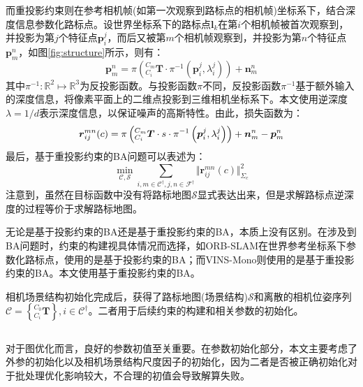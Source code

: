 \begin{enumerate}
        而重投影约束则在参考相机帧(如第一次观察到路标点的相机帧)坐标系下，结合深度信息参数化路标点。设世界坐标系下的路标点$\boldsymbol{l}_k$在第$i$个相机帧被首次观察到，并投影为第$j$个特征点$\boldsymbol{p}_i^j$，而后又被第$m$个相机帧观察到，并投影为第$n$个特征点$\boldsymbol{p}_m^n$，如图\ref{fig:structure}所示，则有：
        \begin{equation}
          \boldsymbol{p}_m^n=\pi\left({^{C_m}_{C_i}\boldsymbol{T}}\cdot \pi^{-1}\left(\boldsymbol{p}_i^j,\lambda_i^j\right)\right) +\boldsymbol{n}_m^n
        \end{equation}
        其中$\pi^{-1}:\mathbb{R}^2\mapsto\mathbb{R}^3$为反投影函数。与投影函数$\pi$不同，反投影函数$\pi^{-1}$基于额外输入的深度信息，将像素平面上的二维点投影到三维相机坐标系下。本文使用逆深度$\lambda=1/d$表示深度信息，以保证噪声的高斯特性\cite{montiel2006unified}。由此，损失函数为：
        \begin{equation}
          \label{equ:reproject}
          \boldsymbol{r}_{ij}^{mn}(c)=\pi\left({^{C_m}_{C_i}\boldsymbol{T}}\cdot s \cdot\pi^{-1}\left(\boldsymbol{p}_i^j,\lambda_i^j\right)\right) +\boldsymbol{n}_m^n-\boldsymbol{p}_m^n \\
        \end{equation}
        最后，基于重投影约束的BA问题可以表述为：
        \begin{equation}
          \min_{\mathcal{C},\mathcal{S}} \sum_{i,m\in\mathcal{C}^\dagger,j,n\in\mathcal{F}^\dagger}\Vert \boldsymbol{r}_{ij}^{mn}(c)\Vert^2_{\Sigma_c}
        \end{equation}
        注意到，虽然在目标函数中没有将路标地图$\mathcal{S}$显式表达出来，但是求解路标点逆深度的过程等价于求解路标地图。

        无论是基于投影约束的BA还是基于重投影约束的BA，本质上没有区别。在涉及到BA问题时，约束的构建视具体情况而选择，如ORB-SLAM\cite{mur2015orb}在世界参考坐标系下参数化路标点，使用的是基于投影约束的BA；而VINS-Mono\cite{qin2018vins}则使用的是基于重投影约束的BA。本文使用基于重投影约束的BA。

\end{enumerate}
相机场景结构初始化完成后，获得了路标地图(场景结构)$\mathcal{S}$和离散的相机位姿序列$\mathcal{C}=\left\lbrace {^{C_0}_{C_{i}}}\boldsymbol{T} \right\rbrace,i\in\mathcal{C}^\dagger$。二者用于后续约束的构建和相关参数的初始化。

\subsection{}
对于图优化而言，良好的参数初值至关重要。在参数初始化部分，本文主要考虑了外参的初始化以及相机场景结构尺度因子的初始化，因为二者是否被正确初始化对于批处理优化影响较大，不合理的初值会导致解算失败。

